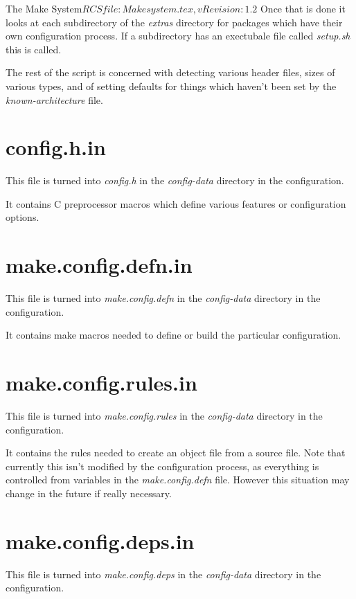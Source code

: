 \begin{cactuspart}{3}{The Make System}{$RCSfile: Makesystem.tex,v $}{$Revision: 1.2 $}
Once that is done it looks at each subdirectory of the {\em extras}
directory for packages which have their own configuration process.  If a
subdirectory has an exectubale file called {\em setup.sh} this is called.

The rest of the script is concerned with detecting various header files,
sizes of various types, and of setting defaults for things which haven't
been set by the {\em known-architecture} file.

\section{config.h.in}
\label{sec:autoconf:h}

This file is turned into {\em config.h} in the {\em config-data}
directory in the configuration.

It contains C preprocessor macros which define various features or
configuration options.

\section{make.config.defn.in}
\label{sec:autoconf:defn}

This file is turned into {\em make.config.defn} in the {\em config-data}
directory in the configuration.

It contains make macros needed to define or build the particular 
configuration.

\section{make.config.rules.in}
\label{sec:autoconf:rules}

This file is turned into {\em make.config.rules} in the {\em config-data}
directory in the configuration.

It contains the rules needed to create an object file from a source file.
Note that currently this isn't modified by the configuration process, as
everything is controlled from variables in the {\em make.config.defn} file.
However this situation may change in the future if really necessary.

\section{make.config.deps.in}
\label{sec:autoconf:deps}

This file is turned into {\em make.config.deps} in the {\em config-data}
directory in the configuration.


\end{cactuspart}
